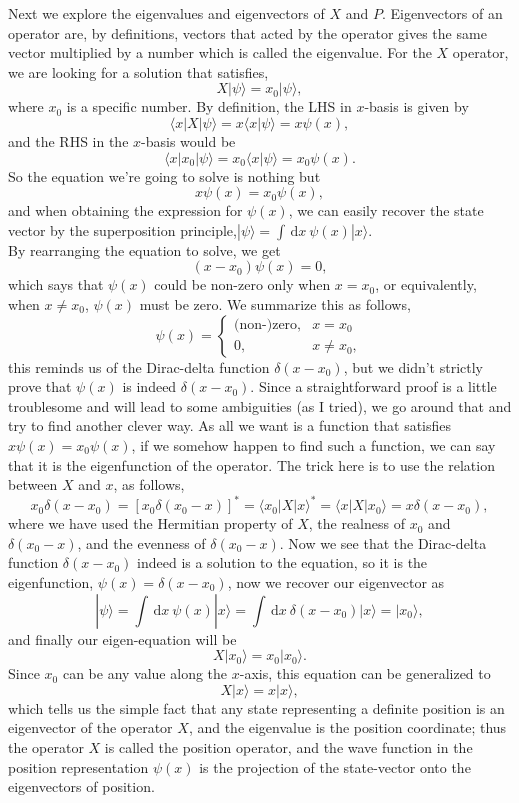 \documentclass{article}
\newcommand{\be}{\begin{equation}}
\newcommand{\ee}{\end{equation}}
\newcommand{\dif}{\,\mathrm{d}}
\renewcommand{\1}{\left}
\renewcommand{\2}{\right}
\newcommand{\la}{\langle}
\newcommand{\ra}{\rangle}
\newcommand{\del}{\delta}
\begin{document}
Next we explore the eigenvalues and eigenvectors of $X$ and $P$. Eigenvectors of an operator are, by definitions, vectors that acted by the operator gives the same vector multiplied by a number which is called the eigenvalue. For the $X$ operator, we are looking for a solution that satisfies,
\be
X|\psi\ra=x_0|\psi\ra,
\ee
where $x_0$ is a specific number. By definition, the LHS in $x$-basis is given by
\be
\la x|X|\psi\ra=x\la x|\psi\ra=x\psi(x),
\ee
and the RHS in the $x$-basis would be
\be
\la x|x_0|\psi\ra=x_0\la x|\psi\ra=x_0\psi(x).
\ee
So the equation we're going to solve is nothing but
\be
x\psi(x)=x_0\psi(x),
\ee
and when obtaining the expression for $\psi(x)$, we can easily recover the state vector by the superposition principle,$|\psi\ra=\int\dif x\ \psi(x)|x\ra$.\\
By rearranging the equation to solve, we get
\be
(x-x_0)\psi(x)=0,
\ee
which says that $\psi(x)$ could be non-zero only when $x=x_0$, or equivalently, when $x\ne x_0$, $\psi(x)$ must be zero. We summarize this as follows,
\be
\psi(x)= \begin{cases}
\text{(non-)zero}, & x=x_0 \\
0, & x\ne x_0,
\end{cases}
\ee
this reminds us of the Dirac-delta function $\delta(x-x_0)$, but we didn't strictly prove that $\psi(x)$ is indeed $\del(x-x_0)$. Since a straightforward proof is a little troublesome and will lead to some ambiguities (as I tried), we go around that and try to find another clever way. As all we want is a function that satisfies $x\psi(x)=x_0\psi(x)$, if we somehow happen to find such a function, we can say that it is the eigenfunction of the operator. The trick here is to use the relation between $X$ and $x$, as follows,
\be
x_0\del(x-x_0)=[x_0\del(x_0-x)]^*=\la x_0|X|x\ra^*=\la x|X|x_0\ra=x\del(x-x_0),
\ee
where we have used the Hermitian property of $X$, the realness of $x_0$ and $\del(x_0-x)$, and the evenness of $\del(x_0-x)$. Now we see that the Dirac-delta function $\del(x-x_0)$ indeed is a solution to the equation, so it is the eigenfunction, $\psi(x)=\delta(x-x_0)$, now we recover our eigenvector as
\be
|\psi\ra=\int\dif x\ \psi(x)|x\ra=\int\dif x\ \del(x-x_0) |x\ra =|x_0\ra,
\ee
and finally our eigen-equation will be
\be
X|x_0\ra=x_0|x_0\ra.
\ee
Since $x_0$ can be any value along the $x$-axis, this equation can be generalized to
\be
X|x\ra=x|x\ra,
\ee
which tells us the simple fact that any state representing a definite position is an eigenvector of the operator $X$, and the eigenvalue is the position coordinate; thus the operator $X$ is called the position operator, and the wave function in the position representation $\psi(x)$ is the projection of the state-vector onto the eigenvectors of position.\\
\end{document}
